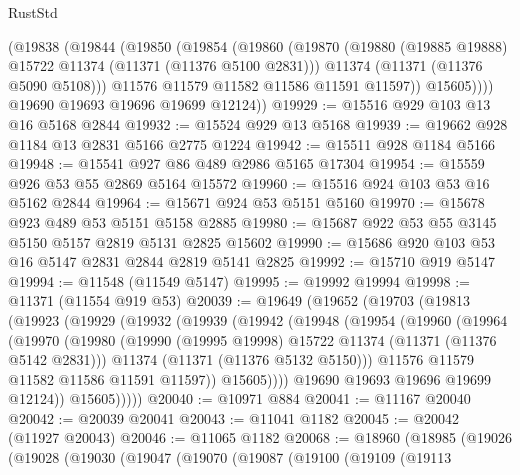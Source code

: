 \begin{lexlean}{RustStd}
\begin{coremodule}
          (@19838
            (@19844
              (@19850
                (@19854
                  (@19860
                    (@19870
                      (@19880 (@19885 @19888) @15722 @11374 (@11371 (@11376 @5100 @2831)))
                      @11374
                      (@11371 (@11376 @5090 @5108)))
                    @11576
                    @11579
                    @11582
                    @11586
                    @11591
                    @11597))
                @15605))))
        @19690
        @19693
        @19696
        @19699
        @12124))
@19929 := @15516 @929 @103 @13 @16 @5168 @2844
@19932 := @15524 @929 @13 @5168
@19939 := @19662 @928 @1184 @13 @2831 @5166 @2775 @1224
@19942 := @15511 @928 @1184 @5166
@19948 := @15541 @927 @86 @489 @2986 @5165 @17304
@19954 := @15559 @926 @53 @55 @2869 @5164 @15572
@19960 := @15516 @924 @103 @53 @16 @5162 @2844
@19964 := @15671 @924 @53 @5151 @5160
@19970 := @15678 @923 @489 @53 @5151 @5158 @2885
@19980 := @15687 @922 @53 @55 @3145 @5150 @5157 @2819 @5131 @2825 @15602
@19990 := @15686 @920 @103 @53 @16 @5147 @2831 @2844 @2819 @5141 @2825
@19992 := @15710 @919 @5147
@19994 := @11548 (@11549 @5147)
@19995 := @19992 @19994
@19998 := @11371 (@11554 @919 @53)
@20039 := @19649
    (@19652
      (@19703
        (@19813
          (@19923
            (@19929
              (@19932
                (@19939
                  (@19942
                    (@19948
                      (@19954
                        (@19960
                          (@19964
                            (@19970
                              (@19980
                                (@19990 (@19995 @19998) @15722 @11374 (@11371 (@11376 @5142 @2831)))
                                @11374
                                (@11371 (@11376 @5132 @5150)))
                              @11576
                              @11579
                              @11582
                              @11586
                              @11591
                              @11597))
                          @15605))))
                  @19690
                  @19693
                  @19696
                  @19699
                  @12124))
              @15605)))))
@20040 := @10971 @884
@20041 := @11167 @20040
@20042 := @20039 @20041
@20043 := @11041 @1182
@20045 := @20042 (@11927 @20043)
@20046 := @11065 @1182
@20068 := @18960
    (@18985
      (@19026
        (@19028
          (@19030
            (@19047
              (@19070
                (@19087
                  (@19100
                    (@19109
                      (@19113

\end{coremodule}
\end{lexlean}
